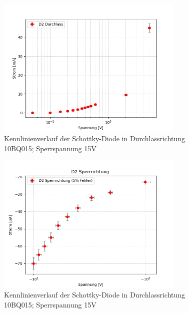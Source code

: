 \documentclass{article}
\theoremstyle{definition}
\begin{document}
\begin{figure}[H]
    \centering
    \includegraphics[width=0.8\textwidth]{figs/dioden_d2.png}
    \caption{Kennlinienverlauf der Schottky-Diode in Durchlassrichtung 10BQ015; Sperrspannung 15V\cite{anleitung}}
    \label{dioden_d2}
\end{figure}

\begin{figure}[H]
    \centering
    \includegraphics[width=0.8\textwidth]{figs/dioden_d2_sperr.png}
    \caption{Kennlinienverlauf der Schottky-Diode in Durchlassrichtung 10BQ015; Sperrspannung 15V\cite{anleitung}}
    \label{dioden_d2_sperr}
\end{figure}

\clearpage
\listoffigures
\printbibliography
\end{document}
